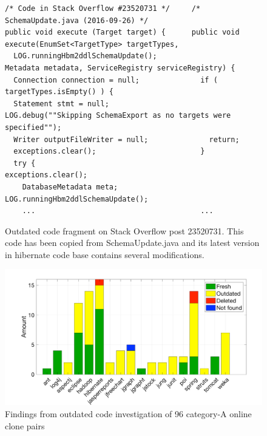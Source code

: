 \documentclass{sig-alternate-05-2015}
\begin{document}
\begin{figure}
	\begin{lstlisting}
/* Code in Stack Overflow #23520731 */     /* SchemaUpdate.java (2016-09-26) */
public void execute (Target target) {      public void execute(EnumSet<TargetType> targetTypes, 
  LOG.runningHbm2ddlSchemaUpdate();                        Metadata metadata, ServiceRegistry serviceRegistry) {
  Connection connection = null;              if ( targetTypes.isEmpty() ) {
  Statement stmt = null;                       LOG.debug(""Skipping SchemaExport as no targets were specified"");
  Writer outputFileWriter = null;              return;
  exceptions.clear();                        }
  try {                                      exceptions.clear();
    DatabaseMetadata meta;                   LOG.runningHbm2ddlSchemaUpdate();
    ...                                      ...
	\end{lstlisting}
	\caption{Outdated code fragment on Stack Overflow post 23520731. This code has been copied from SchemaUpdate.java and its latest version in hibernate code base contains several modifications.}
	\label{fig:hibernate_outdated_code}
\end{figure}

\begin{figure}
	\centering
	\includegraphics[width=\linewidth]{outdated}
	\caption{Findings from outdated code investigation of 96 category-A online clone pairs}
	\label{fig:outdated}
\end{figure}
\end{document}
